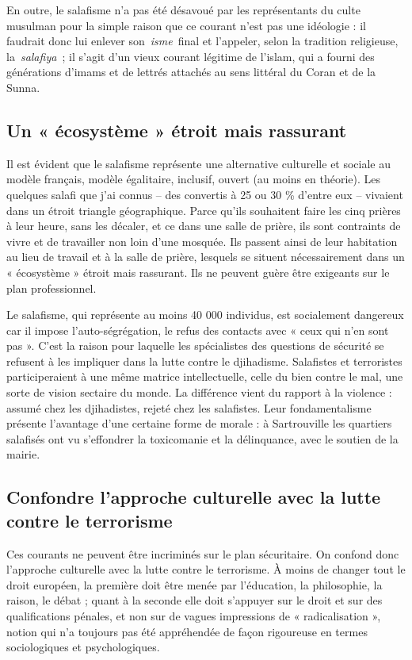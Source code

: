En outre, le salafisme n'a pas été désavoué par les représentants du
culte musulman pour la simple raison que ce courant n'est pas une
idéologie : il faudrait donc lui enlever son~\emph{isme}~final et
l'appeler, selon la tradition religieuse, la~\emph{salafiya~}; il s'agit
d'un vieux courant légitime de l'islam, qui a fourni des générations
d'imams et de lettrés attachés au sens littéral du Coran et de la Sunna.

\subsection{Un « écosystème » étroit mais rassurant}

Il est évident que le salafisme représente une alternative culturelle et
sociale au modèle français, modèle égalitaire, inclusif, ouvert (au
moins en théorie). Les quelques salafi que j'ai connus -- des convertis
à 25 ou 30 \% d'entre eux -- vivaient dans un étroit triangle
géographique. Parce qu'ils souhaitent faire les cinq prières à leur
heure, sans les décaler, et ce dans une salle de prière, ils sont
contraints de vivre et de travailler non loin d'une mosquée. Ils passent
ainsi de leur habitation au lieu de travail et à la salle de prière,
lesquels se situent nécessairement dans un « écosystème » étroit mais
rassurant. Ils ne peuvent guère être exigeants sur le plan
professionnel.



Le salafisme, qui représente au moins 40 000 individus, est socialement
dangereux car il impose l'auto-ségrégation, le refus des contacts avec «
ceux qui n'en sont pas ». C'est la raison pour laquelle les spécialistes
des questions de sécurité se refusent à les impliquer dans la lutte
contre le djihadisme. Salafistes et terroristes participeraient à une
même matrice intellectuelle, celle du bien contre le mal, une sorte de
vision sectaire du monde. La différence vient du rapport à la violence :
assumé chez les djihadistes, rejeté chez les salafistes. Leur
fondamentalisme présente l'avantage d'une certaine forme de morale : à
Sartrouville les quartiers salafisés ont vu s'effondrer la toxicomanie
et la délinquance, avec le soutien de la mairie.

\subsection{Confondre l'approche culturelle avec la lutte contre le
terrorisme}

Ces courants ne peuvent être incriminés sur le plan sécuritaire. On
confond donc l'approche culturelle avec la lutte contre le terrorisme. À
moins de changer tout le droit européen, la première doit être menée par
l'éducation, la philosophie, la raison, le débat ; quant à la seconde
elle doit s'appuyer sur le droit et sur des qualifications pénales, et
non sur de vagues impressions de « radicalisation », notion qui n'a
toujours pas été appréhendée de façon rigoureuse en termes sociologiques
et psychologiques.

